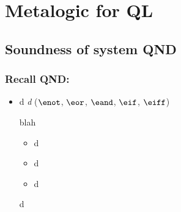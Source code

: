 ﻿%

\setcounter{section}{12}
\section{Metalogic for QL}

\subsection{Soundness of system QND}

\begin{frame}
\frametitle{Recall QND:}

  \begin{itemize}[<+->]
    \item d
    \emph{d} ($\enot$, $\eor$, $\eand$, $\eif$, $\eiff$)
  
  \begin{block}{blah}
    \begin{itemize}[<+->]
      \item[] d

  \item[] d

  \item[] d
\end{itemize} 
\end{block}

  \begin{definition}
  d
  \end{definition}


\end{itemize}
\end{frame}